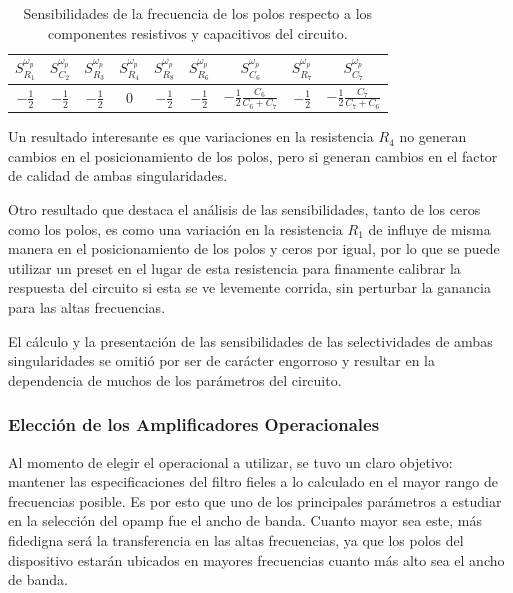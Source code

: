 \begin{table}[H]
\centering
\begin{tabular}{@{}ccccccccc@{}}
\toprule
$S^{\omega_p}_{R_1}$ & $S^{\omega_p}_{C_2}$ & $S^{\omega_p}_{R_3}$ & $S^{\omega_p}_{R_4}$ & $S^{\omega_p}_{R_8}$ & $S^{\omega_p}_{R_6}$ & $S^{\omega_p}_{C_6}$ & $S^{\omega_p}_{R_7}$ & $S^{\omega_p}_{C_7}$  \\ \midrule
$-\frac{1}{2}$ & $-\frac{1}{2}$ & $-\frac{1}{2}$ & $0$ & $-\frac{1}{2}$ & $-\frac{1}{2}$ & $-\frac{1}{2}\frac{C_6}{C_6+C_7}$ & $-\frac{1}{2}$ & $-\frac{1}{2} \frac{C_7}{C_7+ C_6}$ \\ \bottomrule
\end{tabular}
\caption{Sensibilidades de la frecuencia de los polos respecto a los componentes resistivos y capacitivos del circuito.}
\label{tab:sens_wp}
\end{table}

Un resultado interesante es que variaciones en la resistencia $R_4$ no generan cambios en el posicionamiento de los polos, pero si generan cambios en el factor de calidad de ambas singularidades.

Otro resultado que destaca el análisis de las sensibilidades, tanto de los ceros como los polos, es como una variación en la resistencia $R_1$ de influye de misma manera en el posicionamiento de los polos y ceros por igual, por lo que se puede utilizar un preset en el lugar de esta resistencia para finamente calibrar la respuesta del circuito si esta se ve levemente corrida, sin perturbar la ganancia para las altas frecuencias.


El cálculo y la presentación de las sensibilidades de las selectividades de ambas singularidades se omitió por ser de carácter engorroso y resultar en la dependencia de muchos de los parámetros del circuito.

\subsubsection{Elección de los Amplificadores Operacionales}

Al momento de elegir el operacional a utilizar, se tuvo un claro objetivo: mantener las especificaciones del filtro fieles a lo calculado en el mayor rango de frecuencias posible. Es por esto que uno de los principales parámetros a estudiar en la selección del opamp fue el ancho de banda. Cuanto mayor sea este, más fidedigna será la transferencia en las altas frecuencias, ya que los polos del dispositivo estarán ubicados en mayores frecuencias cuanto más alto sea el ancho de banda.

